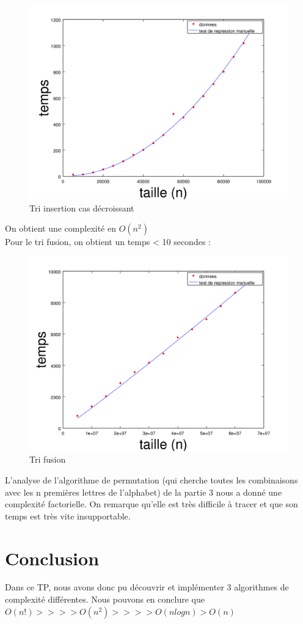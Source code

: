 \documentclass{article}
\begin{document}
\begin{figure}
	\begin{center}
		\includegraphics[scale=0.7]{decroissant}\\
		Tri insertion cas décroissant
	\end{center}
\end{figure}
On obtient une complexité en $O(n^2)$\\
Pour le tri fusion, on obtient un temps < 10 secondes :
\begin{figure}
	\begin{center}
		\includegraphics[scale=0.7]{fusion}\\
		Tri fusion
	\end{center}
\end{figure}
L'analyse de l'algorithme de permutation (qui cherche toutes les combinaisons avec les n premières lettres de l'alphabet) de la partie 3 nous a donné une complexité factorielle. On remarque qu'elle est très difficile à tracer et que son temps est très vite insupportable.
\section{Conclusion}
Dans ce TP, nous avons donc pu découvrir et implémenter 3 algorithmes de complexité différentes. Nous pouvons en conclure que $O(n!) >>>> O(n^2) >>>> O(nlogn) > O(n)$
\end{document}

